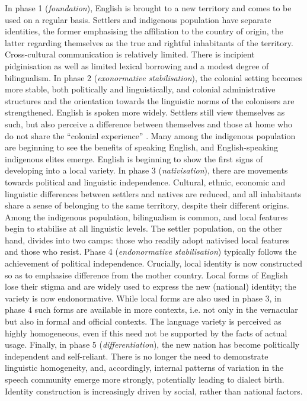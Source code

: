 In phase 1 (\textit{foundation}), English is brought to a new territory and comes to be used on a regular basis. Settlers and indigenous population have separate identities, the former emphasising the affiliation to the country of origin, the latter regarding themselves as the true and rightful inhabitants of the territory. Cross-cultural communication is relatively limited. There is incipient pidgini\-sation as well as limited lexical borrowing and a modest degree of bilingualism. In phase 2 (\textit{exonormative stabilisation}), the colonial setting becomes more stable, both politically and linguistically, and colonial administrative structures and the orientation towards the linguistic norms of the colonisers are strengthened. English is spoken more widely. Settlers still view themselves as such, but also perceive a difference between themselves and those at home who do not share the “colonial experience” \citep[37]{Schneider2007}. Many among the indigenous population are beginning to see the benefits of speaking English, and English-speaking indigenous elites emerge. English is beginning to show the first signs of developing into a local variety. In phase 3 (\textit{nativisation}), there are movements towards political and linguistic independence. Cultural, ethnic, economic and linguistic differences between settlers and natives are reduced, and all inhabitants share a sense of belonging to the same territory, despite their different origins. Among the indigenous population, bilingualism is common, and local features begin to stabilise at all linguistic levels. The settler population, on the other hand, divides into two camps: those who readily adopt nativised local features and those who resist. Phase 4 (\textit{endonormative stabilisation}) typically follows the achievement of political independence. Crucially, local identity is now constructed so as to emphasise difference from the mother country. Local forms of English lose their stigma and are widely used to express the new (national) identity; the variety is now endonormative. While local forms are also used in phase 3, in phase 4 such forms are available in more contexts, i.e. not only in the vernacular but also in formal and official contexts. The language variety is perceived as highly homogeneous, even if this need not be supported by the facts of actual usage. Finally, in phase 5 (\textit{differentiation}), the new nation has become politically independent and self-reliant. There is no longer the need to demonstrate linguistic homogeneity, and, accordingly, internal patterns of variation in the speech community emerge more strongly, potentially leading to dialect birth. Identity construction is increasingly driven by social, rather than national factors.


